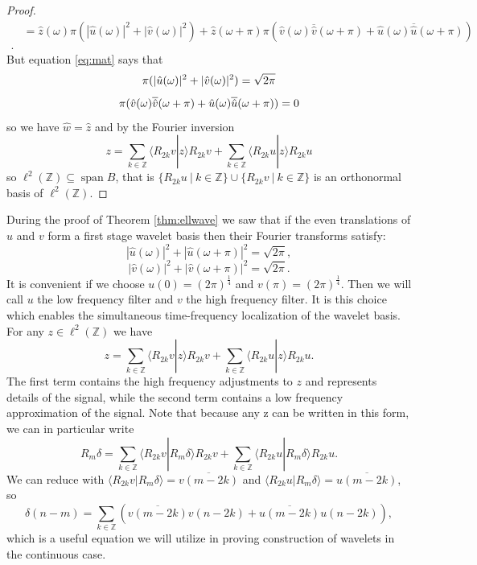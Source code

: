 \documentclass{report}
\newcommand{\Z}{\mathbb{Z}}
\DeclareMathOperator{\spa}{span}
\begin{document}
\begin{proof}
\begin{align*}
&= \hat z (\omega) \pi \left(|\hat u (\omega)|^2+|\hat v (\omega)|^2 \right )+\hat z (\omega +\pi) \pi \left( \hat v (\omega) \overline{\hat v}(\omega+\pi)+\hat u (\omega) \overline{\hat u}(\omega+\pi) \right)\\.
\end{align*}
But equation \ref{eq:mat} says that
$$\pi (|\hat u (\omega)|^2+|\hat v (\omega)|^2)=\sqrt{2\pi}\\$$
$$\pi ( \hat v (\omega) \overline{\hat v}(\omega+\pi)+\hat u (\omega) \overline{\hat u}(\omega+\pi))=0\\$$
so we have $\hat w=\hat z$ and by the Fourier inversion
$$z=\sum_{k\in \Z}\langle R_{2k}v|z\rangle R_{2k}v+\sum_{k\in \Z}\langle R_{2k}u|z\rangle R_{2k}u$$
so $\ell^2 (\Z) \subseteq \spa B$, that is $\{R_{2k}u \ | \ k \in \Z \}\cup\{R_{2k}v \ | \ k \in \Z \}$ is an orthonormal basis of $\ell^2 (\Z)$.
\end{proof}

During the proof of Theorem \ref{thm:ellwave} we saw that if the even translations of $u$ and $v$ form a first stage wavelet basis then their Fourier transforms satisfy: 
$$\left|\hat u\left(\omega \right)\right|^2+\left|\hat u\left(\omega+\pi \right)\right|^2={\sqrt{2\pi}},$$
$$\left|\hat v\left(\omega \right)\right|^2+\left|\hat v\left(\omega+\pi \right)\right|^2= {\sqrt{2\pi}}.$$
It is convenient if we choose $u(0)= ( 2\pi)^\frac{1}{4}$ and $v(\pi)= (2 \pi)^\frac{1}{4}$. Then we will call $u$ the low frequency filter and $v$ the high frequency filter. It is this choice which enables the simultaneous time-frequency localization of the wavelet basis. For any $z \in\ell^2 (\Z)$ we have
$$z=\sum_{k\in \Z}\langle R_{2k}v|z\rangle R_{2k}v+\sum_{k\in \Z}\langle R_{2k}u|z\rangle R_{2k}u.$$
The first term contains the high frequency adjustments to $z$ and represents details of the signal, while the second term contains a low frequency approximation of the signal. Note that because any z can be written in this form, we can in particular write
$$R_m\delta=\sum_{k\in \Z}\langle R_{2k}v|R_m\delta\rangle R_{2k}v+ \sum_{k\in \Z}\langle R_{2k}u|R_m \delta\rangle R_{2k}u.$$
We can reduce with $\langle R_{2k}v|R_m\delta\rangle=\overline{v(m-2k)}$ and $\langle R_{2k}u|R_m\delta\rangle=\overline{u(m-2k)}$, so 
\begin{equation}\label{eq:delta}\delta(n-m)=\sum_{k \in \Z}( \overline{v(m-2k)}v(n-2k) +\overline{u(m-2k)}u(n-2k)),\end{equation}
which is a useful equation we will utilize in proving construction of wavelets in the continuous case. 
\end{document}
